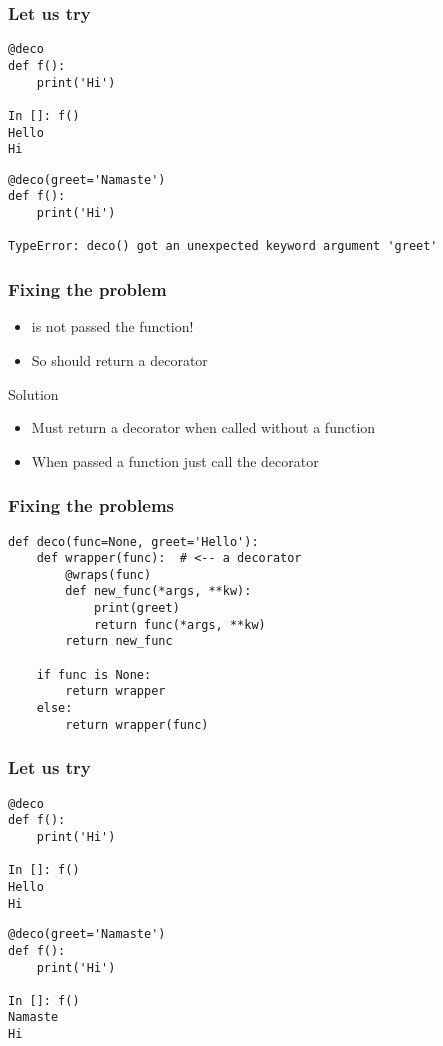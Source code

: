 \documentclass[14pt,compress,aspectratio=169]{beamer}
\begin{document}
\begin{frame}[fragile]
  \frametitle{Let us try}
  \small
  \begin{lstlisting}
@deco
def f():
    print('Hi')

In []: f()
Hello
Hi
\end{lstlisting}
\pause
\begin{lstlisting}
@deco(greet='Namaste')
def f():
    print('Hi')

TypeError: deco() got an unexpected keyword argument 'greet'
  \end{lstlisting}
\end{frame}

\begin{frame}
  \frametitle{Fixing the problem}
  \begin{itemize}
  \item {} is not passed the function!
  \item So  should return a decorator
    \vspace*{0.2in}
  \end{itemize}
\pause
  \begin{block}{Solution}
    \begin{itemize}
    \item Must return a decorator when called without a function
    \item When passed a function just call the decorator
    \end{itemize}
  \end{block}
\end{frame}

\begin{frame}
  \frametitle{Fixing the problems}
  \small
  \begin{lstlisting}
def deco(func=None, greet='Hello'):
    def wrapper(func):  # <-- a decorator
        @wraps(func)
        def new_func(*args, **kw):
            print(greet)
            return func(*args, **kw)
        return new_func

    if func is None:
        return wrapper
    else:
        return wrapper(func)

  \end{lstlisting}
\end{frame}

\begin{frame}[fragile]
  \frametitle{Let us try}
  \small
  \begin{lstlisting}
@deco
def f():
    print('Hi')

In []: f()
Hello
Hi
\end{lstlisting}
\pause
\begin{lstlisting}
@deco(greet='Namaste')
def f():
    print('Hi')

In []: f()
Namaste
Hi

  \end{lstlisting}
\end{frame}
\end{document}
